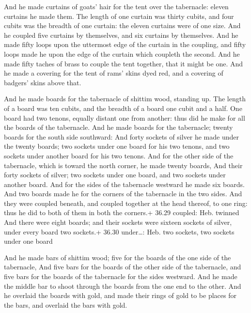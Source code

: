  And he made curtains of goats' hair for the tent over
the tabernacle: eleven curtains he made them.  The length
of one curtain was thirty cubits, and four cubits was the breadth of one
curtain: the eleven curtains were of one size.  And he
coupled five curtains by themselves, and six curtains by themselves.
 And he made fifty loops upon the uttermost edge of the
curtain in the coupling, and fifty loops made he upon the edge of the
curtain which coupleth the second.  And he made fifty
taches of brass to couple the tent together, that it might be one.
 And he made a covering for the tent of rams' skins dyed
red, and a covering of badgers' skins above that.

 And he made boards for the tabernacle of shittim wood,
standing up.  The length of a board was ten cubits, and the
breadth of a board one cubit and a half.  One board had two
tenons, equally distant one from another: thus did he make for all the
boards of the tabernacle.  And he made boards for the
tabernacle; twenty boards for the south side southward: 
And forty sockets of silver he made under the twenty boards; two sockets
under one board for his two tenons, and two sockets under another board
for his two tenons.  And for the other side of the
tabernacle, which is toward the north corner, he made twenty boards,
 And their forty sockets of silver; two sockets under one
board, and two sockets under another board.  And for the
sides of the tabernacle westward he made six boards.  And
two boards made he for the corners of the tabernacle in the two sides.
 And they were coupled beneath, and coupled together at the
head thereof, to one ring: thus he did to both of them in both the
corners.+ 36.29 coupled: Heb. twinned  And there were eight
boards; and their sockets were sixteen sockets of silver, under every
board two sockets.+ 36.30 under\ldots: Heb. two sockets, two sockets
under one board

 And he made bars of shittim wood; five for the boards of
the one side of the tabernacle,  And five bars for the
boards of the other side of the tabernacle, and five bars for the boards
of the tabernacle for the sides westward.  And he made the
middle bar to shoot through the boards from the one end to the other.
 And he overlaid the boards with gold, and made their rings
of gold to be places for the bars, and overlaid the bars with gold.

